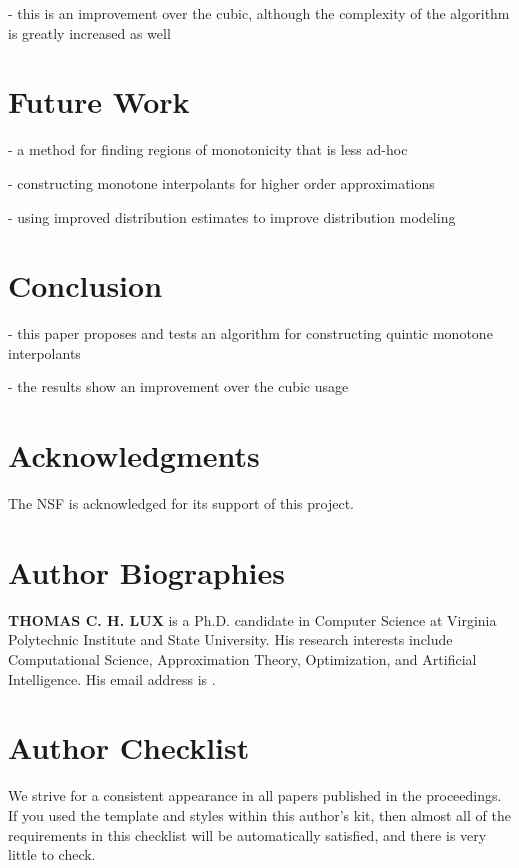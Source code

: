 \documentclass{scspaperproc}
\theoremstyle{scsthe}
\begin{document}
- this is an improvement over the cubic, although the complexity of
  the algorithm is greatly increased as well

\section{Future Work}

- a method for finding regions of monotonicity that is less ad-hoc 

- constructing monotone interpolants for higher order approximations

- using improved distribution estimates to improve distribution modeling

\section{Conclusion}

- this paper proposes and tests an algorithm for constructing quintic
  monotone interpolants

- the results show an improvement over the cubic usage




\section*{Acknowledgments}
The NSF is acknowledged for its support of this project.





\section*{Author Biographies}

\textbf{\uppercase{THOMAS C. H. LUX}} is a Ph.D. candidate in Computer Science at Virginia Polytechnic Institute and State University. His research interests include Computational Science, Approximation Theory, Optimization, and Artificial Intelligence. His email address is .

\newpage

\appendix

\section{Author Checklist}
We strive for a consistent appearance in all papers published in the proceedings. If you used the template and styles within this author’s kit, then almost all of the requirements in this checklist will be automatically satisfied, and there is very little to check.
\end{document}
